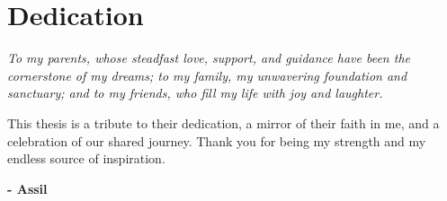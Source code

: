 \chapter*{\hfill Dedication \hfill}

\vspace{3cm}

\noindent
\textit{To my parents, whose steadfast love, support, and guidance have been the cornerstone of my dreams; to my family, my unwavering foundation and sanctuary; and to my friends, who fill my life with joy and laughter.}

\noindent
This thesis is a tribute to their dedication, a mirror of their faith in me, and a celebration of our shared journey. Thank you for being my strength and my endless source of inspiration.\\

\begin{flushright}
  \textbf{- Assil}
\end{flushright}